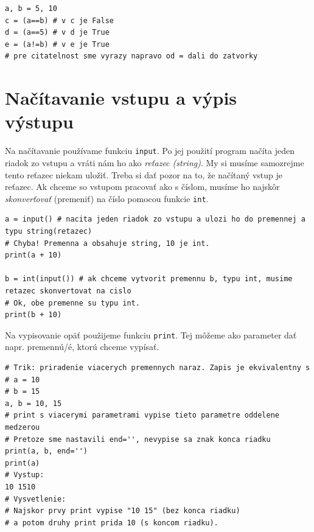\documentclass{article}
\begin{document}
\begin{lstlisting}
a, b = 5, 10
c = (a==b) # v c je False
d = (a==5) # v d je True
e = (a!=b) # v e je True
# pre citatelnost sme vyrazy napravo od = dali do zatvorky
\end{lstlisting}

\section{Načítavanie vstupu a výpis výstupu}



Na načítavanie používame funkciu \texttt{input}. Po jej použití program načíta jeden riadok zo vstupu
a vráti nám ho ako \textit{reťazec (string)}. My si musíme samozrejme tento reťazec niekam uložiť. Treba si dať pozor na to, že načítaný vstup je reťazec. Ak chceme so vstupom pracovať ako s číslom, musíme ho najskôr \textit{skonverťovať} (premeniť) na číslo pomocou funkcie \texttt{int}.


\begin{lstlisting}
a = input() # nacita jeden riadok zo vstupu a ulozi ho do premennej a typu string(retazec)
# Chyba! Premenna a obsahuje string, 10 je int.
print(a + 10)

b = int(input()) # ak chceme vytvorit premennu b, typu int, musime retazec skonvertovat na cislo
# Ok, obe premenne su typu int.
print(b + 10)
\end{lstlisting}

Na vypisovanie opäť použijeme funkciu \texttt{print}.
Tej môžeme ako parameter dať napr. premennú/é, ktorú chceme vypísať.

\begin{lstlisting}
# Trik: priradenie viacerych premennych naraz. Zapis je ekvivalentny s
# a = 10
# b = 15
a, b = 10, 15
# print s viacerymi parametrami vypise tieto parametre oddelene medzerou
# Pretoze sme nastavili end='', nevypise sa znak konca riadku
print(a, b, end='')
print(a)
# Vystup:
10 1510
# Vysvetlenie:
# Najskor prvy print vypise "10 15" (bez konca riadku)
# a potom druhy print prida 10 (s koncom riadku).
\end{lstlisting}
\end{document}
